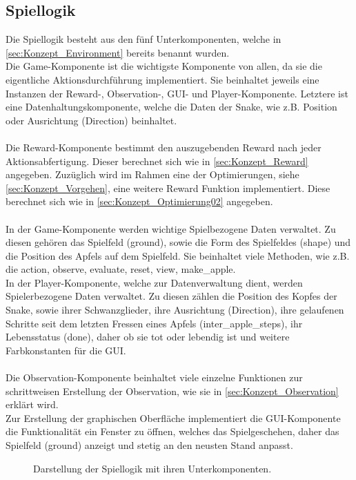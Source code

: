 \subsection{Spiellogik} \label{sec:Konzept_Spiellogik}
Die Spiellogik besteht aus den fünf Unterkomponenten, welche in \ref{sec:Konzept_Environment} bereits benannt wurden.\\
Die Game-Komponente ist die wichtigste Komponente von allen, da sie die eigentliche Aktionsdurchführung implementiert. Sie beinhaltet jeweils eine Instanzen der Reward-, Observation-, GUI- und Player-Komponente. Letztere ist eine Datenhaltungskomponente, welche die Daten der Snake, wie z.B. Position oder Ausrichtung (Direction) beinhaltet.\\
\\Die Reward-Komponente bestimmt den auszugebenden Reward nach jeder Aktionsabfertigung. Dieser berechnet sich wie in  \ref{sec:Konzept_Reward} angegeben. Zuzüglich wird im Rahmen eine der Optimierungen, siehe \ref{sec:Konzept_Vorgehen}, eine weitere Reward Funktion implementiert. Diese berechnet sich wie in \ref{sec:Konzept_Optimierung02} angegeben.\\
\\In der Game-Komponente werden wichtige Spielbezogene Daten verwaltet. Zu diesen gehören das Spielfeld (ground), sowie die Form des Spielfeldes (shape) und die Position des Apfels auf dem Spielfeld. Sie beinhaltet viele Methoden, wie z.B. die action, observe, evaluate, reset, view, make\_apple.
\\In der Player-Komponente, welche zur Datenverwaltung dient, werden Spielerbezogene Daten verwaltet. Zu diesen zählen die Position des Kopfes der Snake, sowie ihrer Schwanzglieder, ihre Ausrichtung (Direction), ihre gelaufenen Schritte seit dem letzten Fressen eines Apfels (inter\_apple\_steps), ihr Lebensstatus (done), daher ob sie tot oder lebendig ist und weitere Farbkonstanten für die GUI.\\
\\Die Observation-Komponente beinhaltet viele einzelne Funktionen zur schrittweisen Erstellung der Observation, wie sie in \ref{sec:Konzept_Observation} erklärt wird.
\\Zur Erstellung der graphischen Oberfläche implementiert die GUI-Komponente die Funktionalität ein Fenster zu öffnen, welches das Spielgeschehen, daher das Spielfeld (ground) anzeigt und stetig an den neusten Stand anpasst.
\begin{figure}[H]
	\centering
	\def\svgscale{0.17}
	
	\caption[Spiellogik]{Darstellung der Spiellogik mit ihren Unterkomponenten.}
	\label{fig:Spiellogik}
\end{figure}

